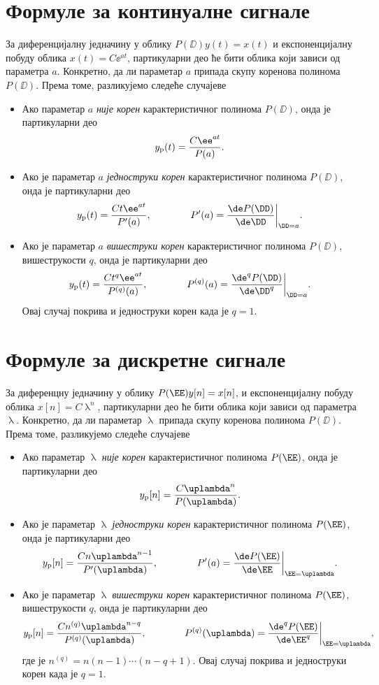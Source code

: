 \section*{Формуле за континуалне сигнале}

За диференцијалну једначину у облику $P(\DD) y(t) = x(t)$ и експоненцијалну побуду облика 
$x(t) = C \ee^{at}$, партикуларни део ће бити облика који зависи од параметра $a$. Конкретно, да ли параметар $a$ припада скупу 
коренова полинома $P(\DD)$. Према томе, разликујемо следеће случајеве
\begin{itemize}
    \item Ако параметар $a$ \emph{није корен} карактеристичног полинома $P(\DD)$, онда је партикуларни део 
    $$
        y_{\rm p}(t) = \dfrac{C\ee^{at}}{P(a)}.
    $$
    \item Ако је параметар $a$ \emph{једноструки корен} карактеристичног полинома $P(\DD)$, онда је партикуларни део 
    $$
        y_{\rm p}(t) = \dfrac{Ct\ee^{at}}{P'(a)}, \qquad\qquad P'(a) = \dfrac{\de P(\DD)}{\de \DD}\bigg\vert_{\DD = a}.
    $$
    \item Ако је параметар $a$ \emph{вишеструки корен} карактеристичног полинома $P(\DD)$, вишеструкости $q$, онда је партикуларни део 
    $$
    y_{\rm p}(t) = \dfrac{Ct^q\ee^{at}}{P^{(q)}(a)}, \qquad\qquad P^{(q)}(a) = \dfrac{\de^q P(\DD)}{\de \DD^q}\bigg\vert_{\DD = a}.
    $$
    Овај случај покрива и једноструки корен када је $q = 1$.
\end{itemize} 

\section*{Формуле за дискретне сигнале}

За диференцну једначину у облику $P(\EE) y[n] = x[n]$, и експоненцијалну побуду облика 
$x[n] = C\uplambda^{n}$, партикуларни део ће бити облика који зависи од параметра $\uplambda$. Конкретно, да ли параметар $\uplambda$ припада скупу 
коренова полинома $P(\DD)$. Према томе, разликујемо следеће случајеве
\begin{itemize}
    \item Ако параметар $\uplambda$ \emph{није корен} карактеристичног полинома $P(\EE)$, онда је партикуларни део 
    $$
        y_{\rm p}[n] = \dfrac{C \uplambda^n }{P(\uplambda)}.
    $$
    \item Ако је параметар $\uplambda$ \emph{једноструки корен} карактеристичног полинома $P(\EE)$, онда је партикуларни део 
    $$
        y_{\rm p}[n] = \dfrac{C n \uplambda^{n-1} }{P'(\uplambda)}, \qquad\qquad P'(a) = \dfrac{\de P(\EE)}{\de \EE}\bigg\vert_{\EE = \uplambda}.
    $$
    \item Ако је параметар $\uplambda$ \emph{вишеструки корен} карактеристичног полинома $P(\EE)$, вишеструкости $q$, онда је партикуларни део 
    $$
    y_{\rm p}[n] = \dfrac{Cn^{(q)}\uplambda^{n - q} }{P^{(q)}(\uplambda)}, \qquad\qquad P^{(q)}(\uplambda) = \dfrac{\de^q P(\EE)}{\de \EE^q}\bigg\vert_{\EE = \uplambda},
    $$
    где је $n^{(q)} = n(n-1)\cdots(n-q+1)$. Овај случај покрива и једноструки корен када је $q = 1$.
\end{itemize} 
